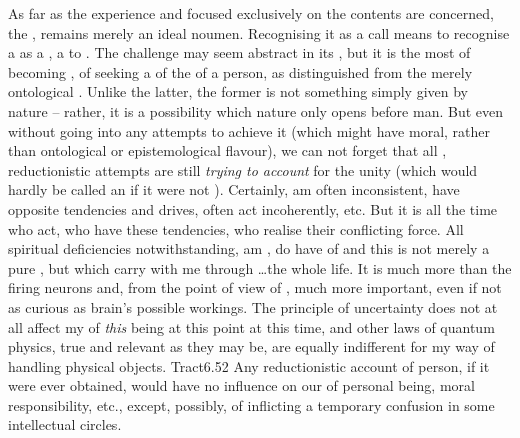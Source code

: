 As far as the experience and  focused exclusively on the
 contents are concerned, the ,  remains merely
an ideal noumen.   Recognising it as a call means to
recognise a  as a , a  to
.
%
The challenge may seem abstract in its , but it is the most
 of becoming , of seeking a  of the  of a person, as distinguished from the merely
ontological .  Unlike the latter, the former is not something
simply given by nature -- rather, it is a possibility which nature only opens
before man.  But even without going into any attempts to achieve it (which might
have moral, rather than ontological or epistemological flavour), we can not
forget that all , reductionistic attempts are still {\em trying
  to account} for the unity (which would hardly be called an  if it
were not ).  Certainly,  am often inconsistent, 
have opposite tendencies and drives,  often act incoherently, etc. But it
is all the time  who act,  who have these tendencies,  who
realise their conflicting force.  All  spiritual deficiencies
notwithstanding,  am ,  do have  of
 and this is not merely a pure , but
 which  carry with me through \ldots the whole life.  It is
much more  than the firing neurons and, from the point of view of
, much more important, even if not as curious as brain's possible
workings.  The principle of uncertainty does not at all affect my
 of {\em this} being  at this point at
 this time, and other laws of quantum physics, true and relevant
as they may be, are equally indifferent for my way of handling physical objects.
\citet{We feel that even when all possible scientific questions have been
  answered, the problems of life remain completely untouched.}{Tract}{6.52} Any
reductionistic account of person, if it were ever obtained, would have no
influence on our  of personal being, moral responsibility, etc.,
except, possibly, of inflicting a temporary confusion in some intellectual
circles.

